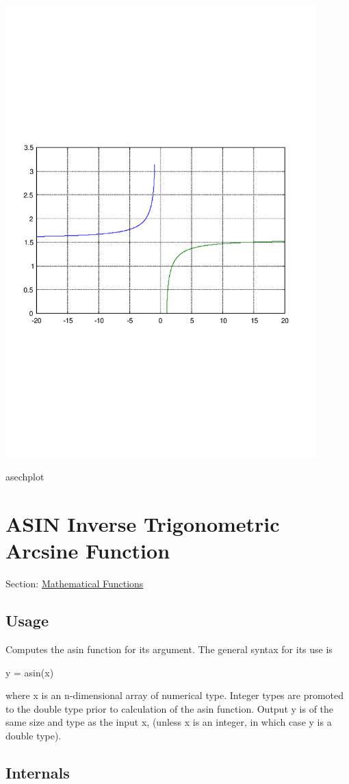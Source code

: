  
\begin{DoxyImage}
\includegraphics[width=12cm]{asechplot}
\caption{asechplot}
\end{DoxyImage}
 \hypertarget{mathfunctions_asin}{}\section{A\-S\-I\-N Inverse Trigonometric Arcsine Function}\label{mathfunctions_asin}
Section\-: \hyperlink{sec_mathfunctions}{Mathematical Functions} \hypertarget{vtkwidgets_vtkxyplotwidget_Usage}{}\subsection{Usage}\label{vtkwidgets_vtkxyplotwidget_Usage}
Computes the {\ttfamily asin} function for its argument. The general syntax for its use is \begin{DoxyVerb}  y = asin(x)
\end{DoxyVerb}
 where {\ttfamily x} is an {\ttfamily n}-\/dimensional array of numerical type. Integer types are promoted to the {\ttfamily double} type prior to calculation of the {\ttfamily asin} function. Output {\ttfamily y} is of the same size and type as the input {\ttfamily x}, (unless {\ttfamily x} is an integer, in which case {\ttfamily y} is a {\ttfamily double} type). \hypertarget{transforms_svd_Function}{}\subsection{Internals}\label{transforms_svd_Function}
